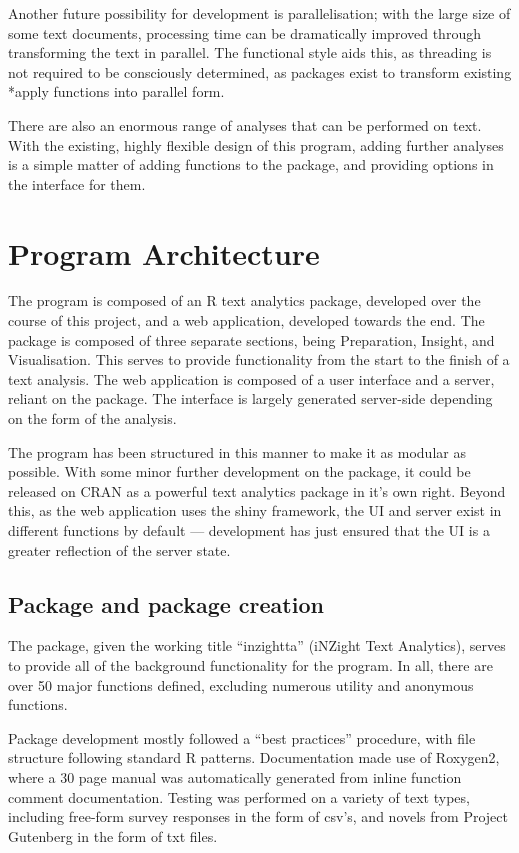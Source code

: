 \documentclass[11pt, a4paper, twoside, titlepage]{report}
\begin{document}
Another future possibility for development is parallelisation; with
the large size of some text documents, processing time can be
dramatically improved through transforming the text in parallel. The
functional style aids this, as threading is not required to be
consciously determined, as packages exist to transform existing *apply
functions into parallel form.

There are also an enormous range of analyses that can be performed on
text. With the existing, highly flexible design of this program,
adding further analyses is a simple matter of adding functions to the
package, and providing options in the interface for them.

\section{Program Architecture}\label{sec:program-architecture-1}

The program is composed of an R text analytics package, developed over
the course of this project, and a web application, developed
towards the end. The package is composed of three separate sections,
being Preparation, Insight, and Visualisation. This serves to provide
functionality from the start to the finish of a text analysis. The web
application is composed of a user interface and a server, reliant on
the package. The interface is largely generated server-side depending
on the form of the analysis.

The program has been structured in this manner to make it as modular
as possible. With some minor further development on the package, it
could be released on CRAN as a powerful text analytics package in it's
own right. Beyond this, as the web application uses the shiny
framework, the UI and server exist in different functions by default
--- development has just ensured that the UI is a greater reflection
of the server state.

\subsection{Package and package creation}

The package, given the working title ``inzightta'' (iNZight Text
Analytics), serves to provide all of the background functionality for
the program. In all, there are over 50 major functions defined,
excluding numerous utility and anonymous functions.

Package development mostly followed a ``best practices'' procedure,
with file structure following standard R patterns. Documentation made
use of Roxygen2\autocite{wickham18roxy}, where a 30 page manual was
automatically generated from inline function comment documentation.
Testing was performed on a variety of text types, including free-form
survey responses in the form of csv's, and novels from Project
Gutenberg in the form of txt files.
\end{document}
